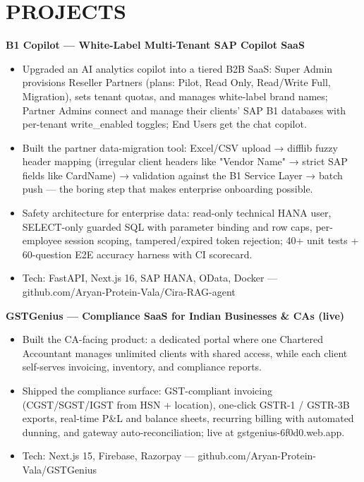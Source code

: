 \documentclass[9pt]{article}
\begin{document}
\section*{PROJECTS}
\textbf{B1 Copilot  ---  White-Label Multi-Tenant SAP Copilot SaaS}
\vspace{1pt}
\begin{itemize}[leftmargin=11pt,itemsep=0pt,topsep=1pt,parsep=0pt]
\item Upgraded an AI analytics copilot into a tiered B2B SaaS: Super Admin provisions Reseller Partners (plans: Pilot, Read Only, Read/Write Full, Migration), sets tenant quotas, and manages white-label brand names; Partner Admins connect and manage their clients' SAP B1 databases with per-tenant write\_enabled toggles; End Users get the chat copilot.
\item Built the partner data-migration tool: Excel/CSV upload → difflib fuzzy header mapping (irregular client headers like "Vendor Name" → strict SAP fields like CardName) → validation against the B1 Service Layer → batch push  ---  the boring step that makes enterprise onboarding possible.
\item Safety architecture for enterprise data: read-only technical HANA user, SELECT-only guarded SQL with parameter binding and row caps, per-employee session scoping, tampered/expired token rejection; 40+ unit tests + 60-question E2E accuracy harness with CI scorecard.
\item Tech: FastAPI, Next.js 16, SAP HANA, OData, Docker  ---  github.com/Aryan-Protein-Vala/Cira-RAG-agent
\end{itemize}
\textbf{GSTGenius  ---  Compliance SaaS for Indian Businesses \& CAs (live)}
\vspace{1pt}
\begin{itemize}[leftmargin=11pt,itemsep=0pt,topsep=1pt,parsep=0pt]
\item Built the CA-facing product: a dedicated portal where one Chartered Accountant manages unlimited clients with shared access, while each client self-serves invoicing, inventory, and compliance reports.
\item Shipped the compliance surface: GST-compliant invoicing (CGST/SGST/IGST from HSN + location), one-click GSTR-1 / GSTR-3B exports, real-time P\&L and balance sheets, recurring billing with automated dunning, and gateway auto-reconciliation; live at gstgenius-6f0d0.web.app.
\item Tech: Next.js 15, Firebase, Razorpay  ---  github.com/Aryan-Protein-Vala/GSTGenius
\end{itemize}
\end{document}
